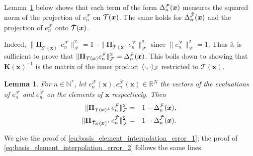 \documentclass[twoside,11pt]{book}
\newtheorem{lemma}{Lemma}
\numberwithin{theorem}{chapter}
\numberwithin{definition}{chapter}
\numberwithin{proposition}{chapter}
\numberwithin{corollary}{chapter}
\numberwithin{example}{chapter}
\numberwithin{lemma}{chapter}
\numberwithin{assumption}{chapter}
\begin{document}
Lemma~\ref{lemma:interpolation_error_matricial_form} below shows that each term of the form $\Delta_n^{\cal F}(\bm{x})$ measures the squared norm of the projection of $e_{n}^{\mathcal{F}}$ on ${\cal T}(\bm{x})$. The same holds for $\Delta_n^{\tilde{\cal F}}(\bm{x})$ and the projection of $e_{n}^{\tilde{\mathcal{F}}}$ onto $\tilde{{\cal T}}(\bm{x})$.

Indeed, $\displaystyle \|\bm{\Pi}_{\mathcal{T}(\bm{x})^{\perp}}e_{n}^{\mathcal{F}}\|^{2}_{\mathcal{F}} = 1- \|\bm{\Pi}_{\mathcal{T}(\bm{x})}e_{n}^{\mathcal{F}}\|^{2}_{\mathcal{F}}$ since $\|e_{n}^{\mathcal{F}}\|^{2}_{\mathcal{F}} = 1$.
Thus it is sufficient to prove that $\|\bm{\Pi}_{\mathcal{T}(\bm{x})}e_{n}^{\mathcal{F}}\|^{2}_{\mathcal{F}} = \Delta_n^{\cal F}(\bm{x})$. This boils down to showing that $\bm{K}(\bm{x})^{-1}$ is the matrix of the inner product $\langle \cdot,\cdot \rangle_{\cal F}$ restricted to ${\mathcal{T}(\bm{x})}$.
\begin{lemma}\label{lemma:interpolation_error_matricial_form}
For $n \in \mathbb{N}^{*}$, let $e_{n}^{\mathcal{F}}(\bm{x}), e_{n}^{\tilde{\mathcal{F}}}(\bm{x})\in \mathbb{R}^{N}$ the vectors of the evaluations of $e_{n}^{\mathcal{F}}$ and $e_{n}^{\tilde{\mathcal{F}}}$ on the elements of $\bm{x}$ respectively. Then
\begin{eqnarray}
  \|\bm{\Pi}_{\mathcal{T}(\bm{x})^{\perp}}e_{n}^{\mathcal{F}}\|^{2}_{\mathcal{F}} & = & 1- \Delta_n^{\cal F}(\bm{x}), \label{eq:basis_element_interpolation_error_1}\\
  \|\bm{\Pi}_{\tilde{\mathcal{T}}_{N}(\bm{x})^{\perp}}e_{n}^{\tilde{\mathcal{F}}}\|^{2}_{\tilde{\mathcal{F}}} & = & 1- \Delta_n^{\tilde{\cal F}} (\bm{x}). \label{eq:basis_element_interpolation_error_2}
\end{eqnarray}
\end{lemma}\label{lemma:interpolation_error_kernel_formula}
We give the proof of \eqref{eq:basis_element_interpolation_error_1}; the proof of \eqref{eq:basis_element_interpolation_error_2} follows the same lines.
\end{document}
